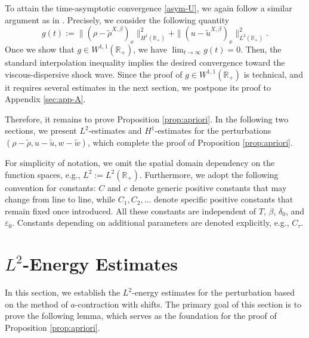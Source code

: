 \documentclass[11pt,reqno]{amsart}
\numberwithin{equation}{section} %
\newcommand{\R}{\mathbb{R}}
\begin{document}
To attain the time-asymptotic convergence \eqref{asym-U}, we again follow a similar argument as in \cite{HK26,KOW25}. Precisely, we consider the following quantity
\begin{equation}\label{def:g}
	g(t):=\|(\rho-\tilde{\rho}^{X,\beta})_x\|_{H^1(\R_+)}^2+\|(u-\tilde{u}^{X,\beta})_x\|_{L^2(\R_+)}^2.
\end{equation}
Once we show that $g\in W^{1,1}(\R_+)$, we have $\lim_{t\to\infty}g(t)=0$. Then, the standard interpolation inequality implies the desired convergence toward the viscous-dispersive shock wave. Since the proof of $g\in W^{1,1}(\R_+)$ is technical, and it requires several estimates in the next section, we postpone its proof to Appendix \ref{sec:app-A}.

\medskip

Therefore, it remains to prove Proposition \ref{prop:apriori}. In the following two sections, we present $L^2$-estimates and $H^1$-estimates for the perturbations $(\rho-\tilde{\rho},u-\tilde{u},w-\tilde{w})$, which complete the proof of Proposition \ref{prop:apriori}. 

For simplicity of notation, we omit the spatial domain dependency on the function spaces, e.g., $L^2:=L^2(\R_+)$. Furthermore, we adopt the following convention for constants: $C$ and $c$ denote generic positive constants that may change from line to line, while $C_1, C_2, \ldots$ denote specific positive constants that remain fixed once introduced. All these constants are independent of $T$, $\beta$, $\delta_0$, and $\varepsilon_0$. Constants depending on additional parameters are denoted explicitly, e.g., $C_\tau$.


\section{\texorpdfstring{$L^2$}{L2}-Energy Estimates}\label{sec:L2_energy}
\setcounter{equation}{0}
In this section, we establish the $L^2$-energy estimates for the perturbation based on the method of $a$-contraction with shifts. The primary goal of this section is to prove the following lemma, which serves as the foundation for the proof of Proposition \ref{prop:apriori}.
\end{document}

